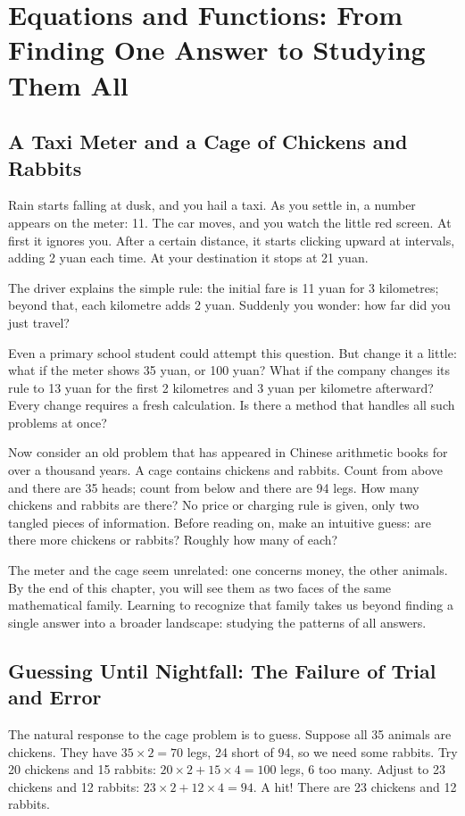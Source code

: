 \chapter{Equations and Functions: From Finding One Answer to Studying Them All}

\section{A Taxi Meter and a Cage of Chickens and Rabbits}

Rain starts falling at dusk, and you hail a taxi. As you settle in, a number appears on the meter: 11. The car moves, and you watch the little red screen. At first it ignores you. After a certain distance, it starts clicking upward at intervals, adding 2 yuan each time. At your destination it stops at 21 yuan.

The driver explains the simple rule: the initial fare is 11 yuan for 3 kilometres; beyond that, each kilometre adds 2 yuan. Suddenly you wonder: how far did you just travel?

Even a primary school student could attempt this question. But change it a little: what if the meter shows 35 yuan, or 100 yuan? What if the company changes its rule to 13 yuan for the first 2 kilometres and 3 yuan per kilometre afterward? Every change requires a fresh calculation. Is there a method that handles all such problems at once?

Now consider an old problem that has appeared in Chinese arithmetic books for over a thousand years. A cage contains chickens and rabbits. Count from above and there are 35 heads; count from below and there are 94 legs. How many chickens and rabbits are there? No price or charging rule is given, only two tangled pieces of information. Before reading on, make an intuitive guess: are there more chickens or rabbits? Roughly how many of each?

The meter and the cage seem unrelated: one concerns money, the other animals. By the end of this chapter, you will see them as two faces of the same mathematical family. Learning to recognize that family takes us beyond finding a single answer into a broader landscape: studying the patterns of all answers.

\section{Guessing Until Nightfall: The Failure of Trial and Error}

The natural response to the cage problem is to guess. Suppose all 35 animals are chickens. They have $35 \times 2 = 70$ legs, 24 short of 94, so we need some rabbits. Try 20 chickens and 15 rabbits: $20 \times 2 + 15 \times 4 = 100$ legs, 6 too many. Adjust to 23 chickens and 12 rabbits: $23 \times 2 + 12 \times 4 = 94$. A hit! There are 23 chickens and 12 rabbits.

